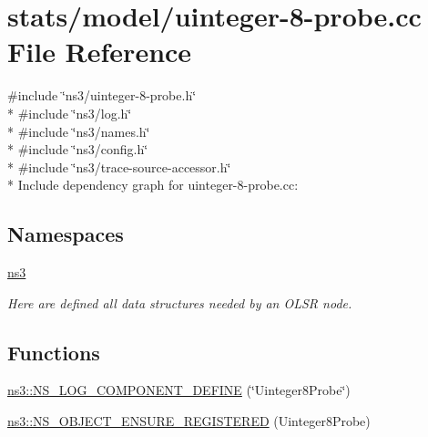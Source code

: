 \hypertarget{uinteger-8-probe_8cc}{}\section{stats/model/uinteger-\/8-\/probe.cc File Reference}
\label{uinteger-8-probe_8cc}
{\ttfamily \#include \char`\"{}ns3/uinteger-\/8-\/probe.\+h\char`\"{}}\\*
{\ttfamily \#include \char`\"{}ns3/log.\+h\char`\"{}}\\*
{\ttfamily \#include \char`\"{}ns3/names.\+h\char`\"{}}\\*
{\ttfamily \#include \char`\"{}ns3/config.\+h\char`\"{}}\\*
{\ttfamily \#include \char`\"{}ns3/trace-\/source-\/accessor.\+h\char`\"{}}\\*
Include dependency graph for uinteger-\/8-\/probe.cc\+:
\subsection*{Namespaces}
\begin{DoxyCompactItemize}
\item 
 \hyperlink{namespacens3}{ns3}
\begin{DoxyCompactList}\small\item\em Here are defined all data structures needed by an O\+L\+SR node. \end{DoxyCompactList}\end{DoxyCompactItemize}
\subsection*{Functions}
\begin{DoxyCompactItemize}
\item 
\hyperlink{namespacens3_a70a31b942543a32c8984f37bcff740fc}{ns3\+::\+N\+S\+\_\+\+L\+O\+G\+\_\+\+C\+O\+M\+P\+O\+N\+E\+N\+T\+\_\+\+D\+E\+F\+I\+NE} (\char`\"{}Uinteger8\+Probe\char`\"{})
\item 
\hyperlink{namespacens3_a49d2229125166d9670a90351063a8088}{ns3\+::\+N\+S\+\_\+\+O\+B\+J\+E\+C\+T\+\_\+\+E\+N\+S\+U\+R\+E\+\_\+\+R\+E\+G\+I\+S\+T\+E\+R\+ED} (Uinteger8\+Probe)
\end{DoxyCompactItemize}
